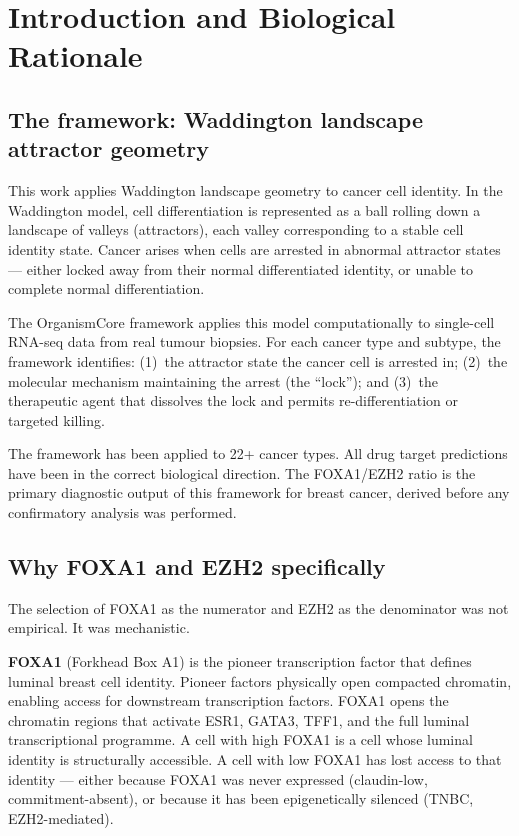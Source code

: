 \documentclass[12pt, a4paper]{article}
\begin{document}
\section{Introduction and Biological Rationale}

\subsection{The framework: Waddington landscape attractor
geometry}

This work applies Waddington landscape geometry to cancer
cell identity. In the Waddington model, cell differentiation
is represented as a ball rolling down a landscape of valleys
(attractors), each valley corresponding to a stable cell
identity state. Cancer arises when cells are arrested in
abnormal attractor states --- either locked away from their
normal differentiated identity, or unable to complete normal
differentiation.

The OrganismCore framework applies this model computationally
to single-cell RNA-seq data from real tumour biopsies. For each
cancer type and subtype, the framework identifies: (1)~the
attractor state the cancer cell is arrested in; (2)~the
molecular mechanism maintaining the arrest (the ``lock'');
and (3)~the therapeutic agent that dissolves the lock
and permits re-differentiation or targeted killing.

The framework has been applied to 22+ cancer types. All
drug target predictions have been in the correct biological
direction. The FOXA1/EZH2 ratio is the primary diagnostic
output of this framework for breast cancer, derived before
any confirmatory analysis was performed.

\subsection{Why FOXA1 and EZH2 specifically}

The selection of FOXA1 as the numerator and EZH2 as the
denominator was not empirical. It was mechanistic.

\textbf{FOXA1} (Forkhead Box A1) is the pioneer transcription
factor that defines luminal breast cell identity. Pioneer
factors physically open compacted chromatin, enabling access
for downstream transcription factors. FOXA1 opens the
chromatin regions that activate ESR1, GATA3, TFF1, and the
full luminal transcriptional programme. A cell with high
FOXA1 is a cell whose luminal identity is structurally
accessible. A cell with low FOXA1 has lost access to that
identity --- either because FOXA1 was never expressed
(claudin-low, commitment-absent), or because it has been
epigenetically silenced (TNBC, EZH2-mediated).
\end{document}
